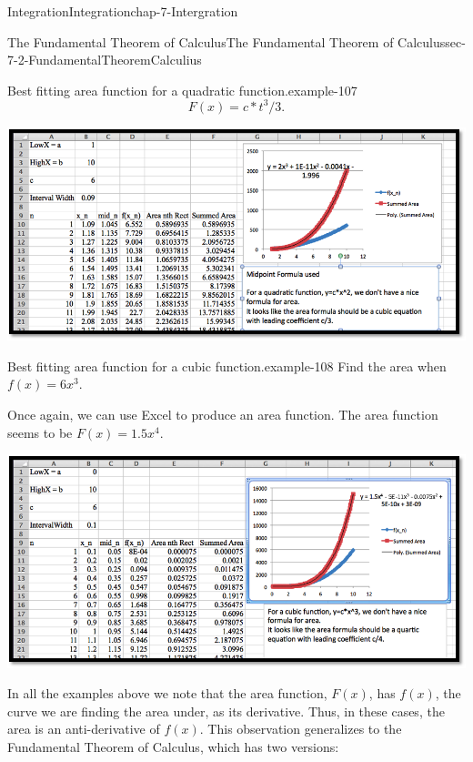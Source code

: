 \documentclass[oneside,10pt,]{book}
\numberwithin{equation}{section}
\begin{document}
\begin{chapterptx}{Integration}{}{Integration}{}{}{chap-7-Intergration}
\begin{sectionptx}{The Fundamental Theorem of Calculus}{}{The Fundamental Theorem of Calculus}{}{}{sec-7-2-FundamentalTheoremCalculius}
\begin{example}{Best fitting area function for a quadratic function.}{example-107}
%
\begin{equation*}
F(x)=c*t^3/3\text{.}
\end{equation*}
\begin{sidebyside}{1}{0}{0}{0}%
\begin{sbspanel}{1}%
\includegraphics[width=1\linewidth]{images/sec7-2-7.png}
\end{sbspanel}%
\end{sidebyside}%
\end{example}
\begin{example}{Best fitting area function for a cubic function.}{example-108}%
\hypertarget{p-2637}{}%
Find the area when \(f(x)=6 x^3\).%
\par
\hypertarget{p-2638}{}%
Once again, we can use Excel to produce an area function.  The area function seems to be \(F(x)=1.5 x^4\).%
\begin{sidebyside}{1}{0}{0}{0}%
\begin{sbspanel}{1}%
\includegraphics[width=1\linewidth]{images/sec7-2-8.png}
\end{sbspanel}%
\end{sidebyside}%
\end{example}
\hypertarget{p-2639}{}%
In all the examples above we note that the area function, \(F(x)\),  has \(f(x)\), the curve we are finding the area under, as its derivative.  Thus, in these cases, the area is an anti-derivative of \(f(x)\).  This observation generalizes to the Fundamental Theorem of Calculus, which has two versions:%

\end{sectionptx}
\end{chapterptx}
\end{document}
